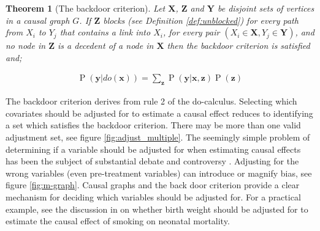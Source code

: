 \documentclass[11pt,a4paper,oneside]{book}
\newcommand{\eqn}[1]{\begin{align}#1\end{align}}
\renewcommand{\P}[1]{\operatorname{P}\left(#1\right)}
\theoremstyle{plain}
\newtheorem{theorem}{Theorem}
\theoremstyle{definition}
\begin{document}
\vspace*{0.3cm}
\begin{theorem}[The backdoor criterion]\citep{Pearl2000}
Let $\boldsymbol{X}$, $\boldsymbol{Z}$ and $\boldsymbol{Y}$ be disjoint sets of vertices in a causal graph $G$. If $\boldsymbol{Z}$ blocks (see Definition \ref{def:unblocked}) for every path from $X_i$ to $Y_j$ that contains a link into $X_i$, for every pair $(X_i \in \boldsymbol{X},Y_j \in \boldsymbol{Y})$, and no node in $\boldsymbol{Z}$ is a decedent of a node in $\boldsymbol{X}$ then the backdoor criterion is satisfied and;

\eqn{
\label{eqn:backdoor}
\P{\boldsymbol{y}|do(\boldsymbol{x})} =\sum_{\boldsymbol{z}} \P{\boldsymbol{y}|\boldsymbol{x},\boldsymbol{z}}\P{\boldsymbol{z}}
}
\end{theorem}

The backdoor criterion derives from rule 2 of the do-calculus. Selecting which covariates should be adjusted for to estimate a causal effect reduces to identifying a set which satisfies the backdoor criterion. There may be more than one valid adjustment set, see figure \ref{fig:adjust_multiple}. The seemingly simple problem of determining if a variable should be adjusted for when estimating causal effects has been the subject of substantial debate and controversy \citep{pearl2009myth}. Adjusting for the wrong variables (even pre-treatment variables) can introduce or magnify bias, see figure \ref{fig:m-graph}. Causal graphs and the back door criterion provide a clear mechanism for deciding which variables should be adjusted for. For a practical example, see the discussion in \citet{schisterman2009overadjustment} on whether birth weight should be adjusted for to estimate the causal effect of smoking on neonatal mortality.  
\end{document}
